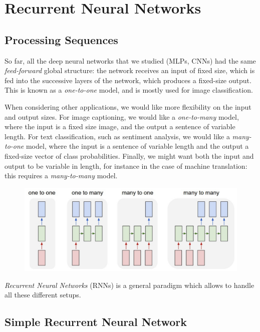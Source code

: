 \newpage
\section{Recurrent Neural Networks}
\subsection{Processing Sequences}
So far, all the deep neural networks that we studied (MLPs, CNNs) had the same \emph{feed-forward} global structure: the network receives an input of fixed size, which is fed into the successive layers of the network, which produces a fixed-size output. This is known as a \emph{one-to-one} model, and is mostly used for image classification.

When considering other applications, we would like more flexibility on the input and output sizes. For image captioning, we would like a \emph{one-to-many} model, where the input is a fixed size image, and the output a sentence of variable length. For text classification, such as sentiment analysis, we would like a \emph{many-to-one} model, where the input is a sentence of variable length and the output a fixed-size vector of class probabilities. Finally, we might want both the input and output to be variable in length, for instance in the case of machine translation: this requires a \emph{many-to-many} model.

\begin{figure}[H]
    \centering
    \includegraphics[width=.8\textwidth]{images/sequences.png}
\end{figure}

\emph{Recurrent Neural Networks} (RNNs) is a general paradigm which allows to handle all these different setups.

\subsection{Simple Recurrent Neural Network}
